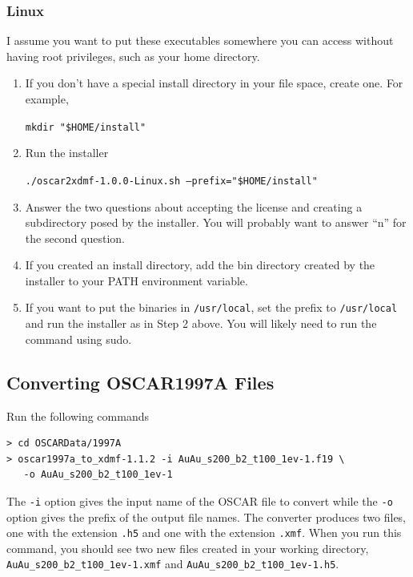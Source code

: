 \documentclass[12pt]{article}
\newcommand{\file}[1]{\texttt{#1}}
\begin{document}
\subsubsection{Linux}

I assume you want to put these executables somewhere you can access without having root privileges, such as your home directory.

\begin{enumerate}

\item If you don’t have a special install directory in your file space, create one. For example,

\texttt{mkdir "\${HOME}/install"}

\item Run the installer

\texttt{./oscar2xdmf-1.0.0-Linux.sh --prefix="\${HOME}/install"}

\item Answer the two questions about accepting the license and creating a subdirectory posed by the installer. You will probably want to answer ``n'' for the second question.

\item If you created an install directory, add the bin directory created by the installer to your PATH environment variable.

\item  If you want to put the binaries in \texttt{/usr/local}, set the prefix to \texttt{/usr/local} and run the installer as in Step 2 above. You will likely need to run the command using sudo.

\end{enumerate}

\subsection{Converting OSCAR1997A Files}

Run the following commands

\begin{verbatim}
> cd OSCARData/1997A
> oscar1997a_to_xdmf-1.1.2 -i AuAu_s200_b2_t100_1ev-1.f19 \
   -o AuAu_s200_b2_t100_1ev-1
\end{verbatim}

The \texttt{-i} option gives the input name of the OSCAR file to convert while the \texttt{-o} option gives the prefix of the output file names. The converter produces two files, one with the extension \file{.h5} and one with the extension \file{.xmf}. When you run this command, you should see two new files created in your working directory, \file{AuAu\_s200\_b2\_t100\_1ev-1.xmf} and \file{AuAu\_s200\_b2\_t100\_1ev-1.h5}.
\end{document}
